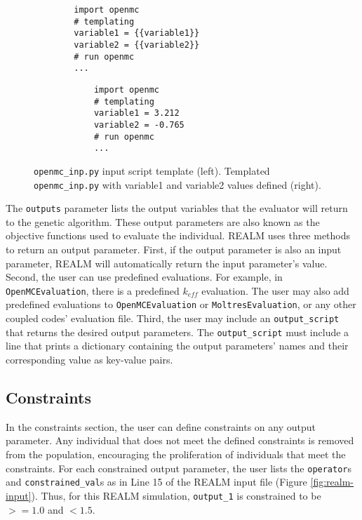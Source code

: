 \begin{figure}[]
    \begin{minipage}{0.4\textwidth}
        \centering
    \begin{verbatim}
        import openmc 
        # templating 
        variable1 = {{variable1}}
        variable2 = {{variable2}}
        # run openmc 
        ... 
    \end{verbatim}
    \end{minipage}
    \hspace{2cm}
    \begin{minipage}{0.4\textwidth}
        \centering
        \begin{verbatim}
            import openmc 
            # templating 
            variable1 = 3.212
            variable2 = -0.765
            # run openmc 
            ... 
        \end{verbatim}
        \end{minipage}
    \caption{\texttt{openmc\_inp.py} input script template (left). 
             Templated \texttt{openmc\_inp.py} with variable1 and variable2 
             values defined (right).}
    \label{fig:openmcinp.py}
\end{figure}

The \texttt{outputs} parameter lists the output variables that the evaluator 
will return to the genetic algorithm. 
These output parameters are also known as the objective functions used to 
evaluate the individual.  
\gls{REALM} uses three methods to return an output parameter. 
First, if the output parameter is also an input parameter, \gls{REALM} will automatically 
return the input parameter's value. 
Second, the user can use predefined evaluations. 
For example, in \texttt{OpenMCEvaluation}, there is a predefined $k_{eff}$ 
evaluation.
The user may also add predefined evaluations to \texttt{OpenMCEvaluation} or 
\texttt{MoltresEvaluation}, or any other coupled codes' evaluation file.
Third, the user may include an \texttt{output\_script} that returns the desired 
output parameters. 
The \texttt{output\_script} must include a line that prints a dictionary containing 
the output parameters' names and their corresponding value as key-value pairs. 

\subsection{Constraints}
In the constraints section, the user can define constraints on any output parameter. 
Any individual that does not meet the defined constraints is removed from the 
population, encouraging the proliferation of individuals that meet the 
constraints. 
For each constrained output parameter, the user lists the \texttt{operator}s 
and \texttt{constrained\_val}s as in Line 15 of the \gls{REALM} input file 
(Figure \ref{fig:realm-input}). 
Thus, for this \gls{REALM} simulation, \texttt{output\_1} is constrained to be 
$>= 1.0$ and $< 1.5$. 

